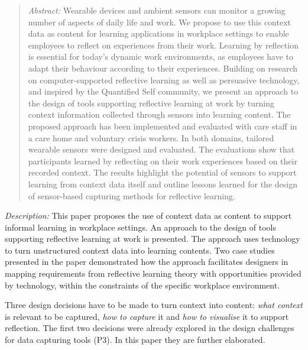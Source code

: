 \begin{quote}
\emph{Abstract:} Wearable devices and ambient sensors can monitor a
growing number of aspects of daily life and work. We propose to use this
context data as content for learning applications in workplace settings
to enable employees to reflect on experiences from their work. Learning
by reflection is essential for today's dynamic work environments, as
employees have to adapt their behaviour according to their experiences.
Building on research on computer-supported reflective learning as well
as persuasive technology, and inspired by the Quantified Self community,
we present an approach to the design of tools supporting reflective
learning at work by turning context information collected through
sensors into learning content. The proposed approach has been
implemented and evaluated with care staff in a care home and voluntary
crisis workers. In both domains, tailored wearable sensors were designed
and evaluated. The evaluations show that participants learned by
reflecting on their work experiences based on their recorded context.
The results highlight the potential of sensors to support learning from
context data itself and outline lessons learned for the design of
sensor-based capturing methods for reflective learning.
\end{quote}

\emph{Description:}  This paper proposes the use of
context data as content to support informal learning in workplace
settings. An approach to the design of tools supporting reflective
learning at work is presented. The approach uses technology to turn
unstructured context data into learning contents. Two case studies
presented in the paper demonstrated how the approach facilitates
designers in mapping requirements from reflective learning theory with
opportunities provided by technology, within the constraints of the
specific workplace environment.

Three design decisions have to be made to turn context into content:
\emph{what context} is relevant to be captured, \emph{how to capture} it
and \emph{how to visualise} it to support reflection. The first two
decisions were already explored in the design challenges for data
capturing tools (P3). In this paper they are further elaborated.

